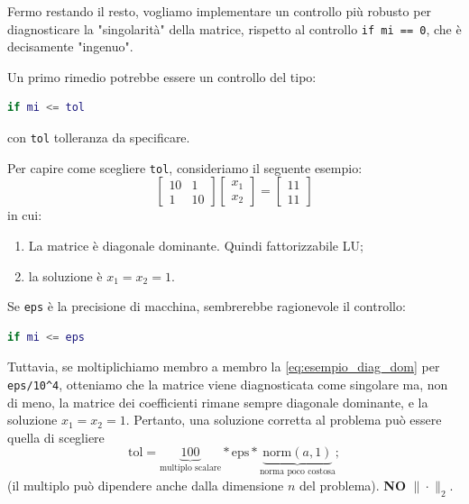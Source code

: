 Fermo restando il resto, vogliamo implementare un controllo più robusto per diagnosticare la "singolarità" della matrice, rispetto al controllo \texttt{if mi == 0}, che è decisamente "ingenuo".

Un primo rimedio potrebbe essere un controllo del tipo:
\begin{lstlisting}[language=matlab, frame=none, numbers=none]
if mi <= tol
\end{lstlisting}
con \texttt{tol} tolleranza da specificare.

Per capire come scegliere \texttt{tol}, consideriamo il seguente esempio:
\begin{equation} \label{eq:esempio_diag_dom}
    \begin{bmatrix} 10 & 1 \\ 1 & 10 \end{bmatrix} 
    \begin{bmatrix} x_1 \\ x_2 \end{bmatrix} = 
    \begin{bmatrix} 11 \\ 11 \end{bmatrix}
\end{equation}
in cui:
\begin{enumerate}
    \item La matrice è diagonale dominante. Quindi fattorizzabile LU;
    \item la soluzione è $x_1 = x_2 = 1$.
\end{enumerate}

Se \texttt{eps} è la precisione di macchina, sembrerebbe ragionevole il controllo:
\begin{lstlisting}[language=matlab, frame=none, numbers=none]
if mi <= eps
\end{lstlisting}

Tuttavia, se moltiplichiamo membro a membro la \eqref{eq:esempio_diag_dom} per \verb|eps/10^4|, otteniamo che la matrice viene diagnosticata come singolare ma, non di meno, la matrice dei coefficienti rimane sempre diagonale dominante, e la soluzione $x_1 = x_2 = 1$.
Pertanto, una soluzione corretta al problema può essere quella di scegliere
\begin{equation} \label{eq:tol_robusta}
    \text{tol} = \underbrace{100}_{\text{multiplo scalare}} * \text{eps} * \underbrace{\text{norm}(a, 1)}_{\text{norma poco costosa}};
\end{equation}
(il multiplo può dipendere anche dalla dimensione $n$ del problema). \textbf{NO} $\| \cdot \|_2$.



